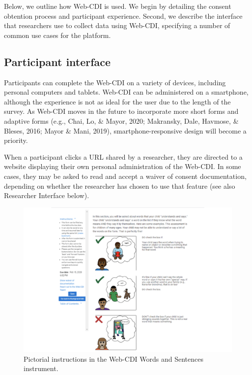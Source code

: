 \documentclass[
  english,
  ,man,floatsintext]{apa6}
\begin{document}
Below, we outline how Web-CDI is used. We begin by detailing the consent obtention process and participant experience. Second, we describe the interface that researchers use to collect data using Web-CDI, specifying a number of common use cases for the platform.

\hypertarget{participant-interface}{%
\subsection{Participant interface}\label{participant-interface}}

Participants can complete the Web-CDI on a variety of devices, including personal computers and tablets. Web-CDI can be administered on a smartphone, although the experience is not as ideal for the user due to the length of the survey. As Web-CDI moves in the future to incorporate more short forms and adaptive forms (e.g., Chai, Lo, \& Mayor, 2020; Makransky, Dale, Havmose, \& Bleses, 2016; Mayor \& Mani, 2019), smartphone-responsive design will become a priority.

When a participant clicks a URL shared by a researcher, they are directed to a website displaying their own personal administration of the Web-CDI. In some cases, they may be asked to read and accept a waiver of consent documentation, depending on whether the researcher has chosen to use that feature (see also Researcher Interface below).

\begin{figure}
\centering
\includegraphics{webcdi_paper_files/figure-latex/pictorial-1.pdf}
\caption{\label{fig:pictorial}Pictorial instructions in the Web-CDI Words and Sentences instrument.}
\end{figure}
\end{document}
